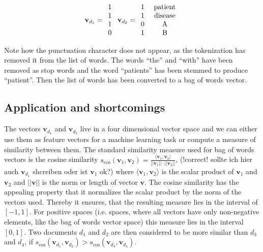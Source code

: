 \[
\textbf{v}_{d_1}=\begin{array}{c}
1\\
1\\
1\\
0
\end{array}\ \textbf{v}_{d_2}=\begin{array}{c}
1\\
1\\
0\\
1
\end{array}\ \begin{array}{c}
\rm{patient}\\
\rm{disease}\\
\rm{A}\\
\rm{B}\\
\end{array}
\]

Note how the punctuation character does not appear, as the tokenization has removed it from the list of words. The words ``the'' and ``with'' have been removed as stop words and the word ``patients'' has been stemmed to produce ``patient''. Then the list of words has been converted to a bag of words vector.

\subsection*{Application and shortcomings}
The vectors $\textbf{v}_{d_1}$ and $\textbf{v}_{d_2}$ live in a four dimensional vector space and we can either use them as feature vectors for a machine learning task or compute a measure of similarity between them. The standard similarity measure used for bag of words vectors is the cosine similarity $s_{\cos}(\textbf{v}_1, \textbf{v}_2)=\frac{\langle\textbf{v}_1,\textbf{v}_2\rangle}{||\textbf{v}_1||\cdot ||\textbf{v}_2||}$, (!correct! sollte ich hier auch $\textbf{v}_{d_1}$ shcreiben oder ist $\textbf{v}_1$ ok?) where $\langle\textbf{v}_1,\textbf{v}_2\rangle$ is the scalar product of $\textbf{v}_1$ and $\textbf{v}_2$ and $||\textbf{v}||$ is the norm or length of vector $\textbf{v}$. The cosine similarity has the appealing property that it normalizes the scalar product by the norm of the vectors used. Thereby it ensures, that the resulting measure lies in the interval of $[-1,1]$. For positive spaces (i.e. spaces, where all vectors have only non-negative elements, like the bag of words vector space) this measure lies in the interval $[0,1]$. Two documents $d_{1}$ and $d_{2}$ are then considered to be more similar than $d_{3}$ and $d_{4}$, if $s_{\cos}(\textbf{v}_{d_1}, \textbf{v}_{d_2}) > s_{\cos}(\textbf{v}_{d_3}, \textbf{v}_{d_4})$.

